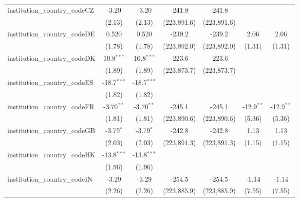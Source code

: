 \begin{tabular}{lcccccc}
   institution\_country\_codeCZ          & -3.20         & -3.20         & -241.8        & -241.8        &               &   \\   
                                         & (2.13)        & (2.13)        & (223,891.6)   & (223,891.6)   &               &   \\   
   institution\_country\_codeDE          & 0.520         & 0.520         & -239.2        & -239.2        & 2.06          & 2.06\\   
                                         & (1.78)        & (1.78)        & (223,892.0)   & (223,892.0)   & (1.31)        & (1.31)\\   
   institution\_country\_codeDK          & 10.8$^{***}$  & 10.8$^{***}$  & -223.6        & -223.6        &               &   \\   
                                         & (1.89)        & (1.89)        & (223,873.7)   & (223,873.7)   &               &   \\   
   institution\_country\_codeES          & -18.7$^{***}$ & -18.7$^{***}$ &               &               &               &   \\   
                                         & (1.82)        & (1.82)        &               &               &               &   \\   
   institution\_country\_codeFR          & -3.70$^{**}$  & -3.70$^{**}$  & -245.1        & -245.1        & -12.9$^{**}$  & -12.9$^{**}$\\   
                                         & (1.81)        & (1.81)        & (223,890.6)   & (223,890.6)   & (5.36)        & (5.36)\\   
   institution\_country\_codeGB          & -3.79$^{*}$   & -3.79$^{*}$   & -242.8        & -242.8        & 1.13          & 1.13\\   
                                         & (2.03)        & (2.03)        & (223,891.3)   & (223,891.3)   & (1.15)        & (1.15)\\   
   institution\_country\_codeHK          & -13.8$^{***}$ & -13.8$^{***}$ &               &               &               &   \\   
                                         & (1.96)        & (1.96)        &               &               &               &   \\   
   institution\_country\_codeIN          & -3.29         & -3.29         & -254.5        & -254.5        & -1.14         & -1.14\\   
                                         & (2.26)        & (2.26)        & (223,885.9)   & (223,885.9)   & (7.55)        & (7.55)\\   

\end{tabular}
